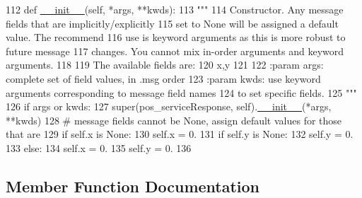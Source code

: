 \begin{DoxyCode}
112   \textcolor{keyword}{def }\hyperlink{classstate__machine_1_1Play_a5993a23d8be7f7b2647f71ede0334957}{\_\_init\_\_}(self, *args, **kwds):
113     \textcolor{stringliteral}{"""}
114 \textcolor{stringliteral}{    Constructor. Any message fields that are implicitly/explicitly}
115 \textcolor{stringliteral}{    set to None will be assigned a default value. The recommend}
116 \textcolor{stringliteral}{    use is keyword arguments as this is more robust to future message}
117 \textcolor{stringliteral}{    changes.  You cannot mix in-order arguments and keyword arguments.}
118 \textcolor{stringliteral}{}
119 \textcolor{stringliteral}{    The available fields are:}
120 \textcolor{stringliteral}{       x,y}
121 \textcolor{stringliteral}{}
122 \textcolor{stringliteral}{    :param args: complete set of field values, in .msg order}
123 \textcolor{stringliteral}{    :param kwds: use keyword arguments corresponding to message field names}
124 \textcolor{stringliteral}{    to set specific fields.}
125 \textcolor{stringliteral}{    """}
126     \textcolor{keywordflow}{if} args \textcolor{keywordflow}{or} kwds:
127       super(pos\_serviceResponse, self).\hyperlink{classstate__machine_1_1Play_a5993a23d8be7f7b2647f71ede0334957}{\_\_init\_\_}(*args, **kwds)
128       \textcolor{comment}{# message fields cannot be None, assign default values for those that are}
129       \textcolor{keywordflow}{if} self.x \textcolor{keywordflow}{is} \textcolor{keywordtype}{None}:
130         self.x = 0.
131       \textcolor{keywordflow}{if} self.y \textcolor{keywordflow}{is} \textcolor{keywordtype}{None}:
132         self.y = 0.
133     \textcolor{keywordflow}{else}:
134       self.x = 0.
135       self.y = 0.
136 
\end{DoxyCode}


\subsection{Member Function Documentation}
\mbox{\label{classass1_1_1srv_1_1__pos__service_1_1pos__serviceResponse_a904cf81143a58e5fc8a67b87c066354e}} 
